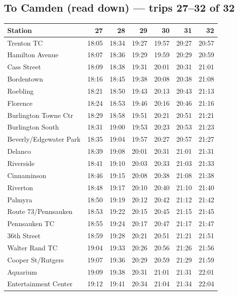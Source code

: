 \subsection*{To Camden (read down) --- trips 27--32 of 32}
\begin{center}\footnotesize\setlength{\tabcolsep}{3pt}\begin{tabular}{@{}lrrrrrr@{}}\toprule
Station & 27 & 28 & 29 & 30 & 31 & 32 \\\midrule
Trenton TC & 18:05 & 18:34 & 19:27 & 19:57 & 20:27 & 20:57 \\
Hamilton Avenue & 18:07 & 18:36 & 19:29 & 19:59 & 20:29 & 20:59 \\
Cass Street & 18:09 & 18:38 & 19:31 & 20:01 & 20:31 & 21:01 \\
Bordentown & 18:16 & 18:45 & 19:38 & 20:08 & 20:38 & 21:08 \\
Roebling & 18:21 & 18:50 & 19:43 & 20:13 & 20:43 & 21:13 \\
Florence & 18:24 & 18:53 & 19:46 & 20:16 & 20:46 & 21:16 \\
Burlington Towne Ctr & 18:29 & 18:58 & 19:51 & 20:21 & 20:51 & 21:21 \\
Burlington South & 18:31 & 19:00 & 19:53 & 20:23 & 20:53 & 21:23 \\
Beverly/Edgewater Park & 18:35 & 19:04 & 19:57 & 20:27 & 20:57 & 21:27 \\
Delanco & 18:39 & 19:08 & 20:01 & 20:31 & 21:01 & 21:31 \\
Riverside & 18:41 & 19:10 & 20:03 & 20:33 & 21:03 & 21:33 \\
Cinnaminson & 18:46 & 19:15 & 20:08 & 20:38 & 21:08 & 21:38 \\
Riverton & 18:48 & 19:17 & 20:10 & 20:40 & 21:10 & 21:40 \\
Palmyra & 18:50 & 19:19 & 20:12 & 20:42 & 21:12 & 21:42 \\
Route 73/Pennsauken & 18:53 & 19:22 & 20:15 & 20:45 & 21:15 & 21:45 \\
Pennsauken TC & 18:55 & 19:24 & 20:17 & 20:47 & 21:17 & 21:47 \\
36th Street & 18:59 & 19:28 & 20:21 & 20:51 & 21:21 & 21:51 \\
Walter Rand TC & 19:04 & 19:33 & 20:26 & 20:56 & 21:26 & 21:56 \\
Cooper St/Rutgers & 19:07 & 19:36 & 20:29 & 20:59 & 21:29 & 21:59 \\
Aquarium & 19:09 & 19:38 & 20:31 & 21:01 & 21:31 & 22:01 \\
Entertainment Center & 19:12 & 19:41 & 20:34 & 21:04 & 21:34 & 22:04 \\
\bottomrule\end{tabular}\end{center}
\clearpage
